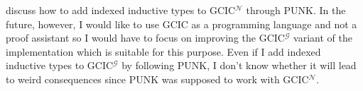 \documentclass{article}
\theoremstyle{definition}
\newcommand{\Gcode}[1]{{\color{OliveGreen}\textit{#1}}}
\newcommand{\GCICN}[0]{GCIC\(^\mathcal{N}\)}
\newcommand{\GCICG}[0]{GCIC\(^\mathcal{G}\)}
\begin{document}

\citet{malewski_gradual_2024} discuss how to add indexed inductive types to
\GCICN{} through PUNK. In the future, however, I would like to use GCIC as a
programming language and not a proof assistant so I would have to focus on
improving the \GCICG{} variant of the implementation which is suitable for this
purpose. Even if I add indexed inductive types to \GCICG{} by following PUNK, I
don't know whether it will lead to weird consequences since PUNK was supposed to
work with \GCICN{}.
\end{document}
